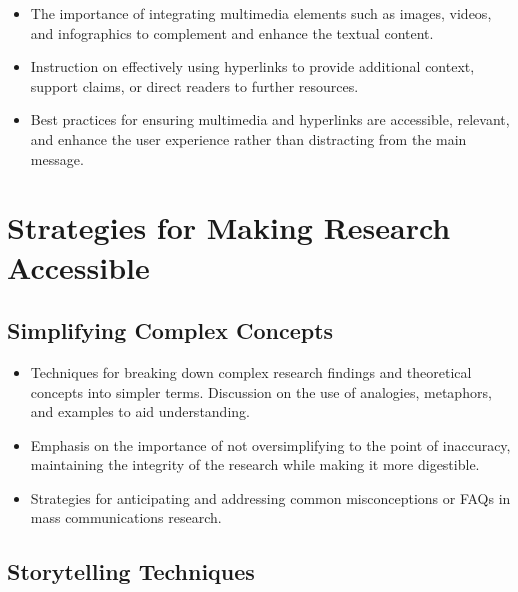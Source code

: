 \documentclass[
]{book}
\begin{document}
\begin{itemize}
\item
  The importance of integrating multimedia elements such as images, videos, and infographics to complement and enhance the textual content.
\item
  Instruction on effectively using hyperlinks to provide additional context, support claims, or direct readers to further resources.
\item
  Best practices for ensuring multimedia and hyperlinks are accessible, relevant, and enhance the user experience rather than distracting from the main message.
\end{itemize}

\hypertarget{strategies-for-making-research-accessible}{%
\section*{Strategies for Making Research Accessible}\label{strategies-for-making-research-accessible}}

\hypertarget{simplifying-complex-concepts}{%
\subsection*{Simplifying Complex Concepts}\label{simplifying-complex-concepts}}

\begin{itemize}
\item
  Techniques for breaking down complex research findings and theoretical concepts into simpler terms. Discussion on the use of analogies, metaphors, and examples to aid understanding.
\item
  Emphasis on the importance of not oversimplifying to the point of inaccuracy, maintaining the integrity of the research while making it more digestible.
\item
  Strategies for anticipating and addressing common misconceptions or FAQs in mass communications research.
\end{itemize}

\hypertarget{storytelling-techniques}{%
\subsection*{Storytelling Techniques}\label{storytelling-techniques}}
\end{document}
